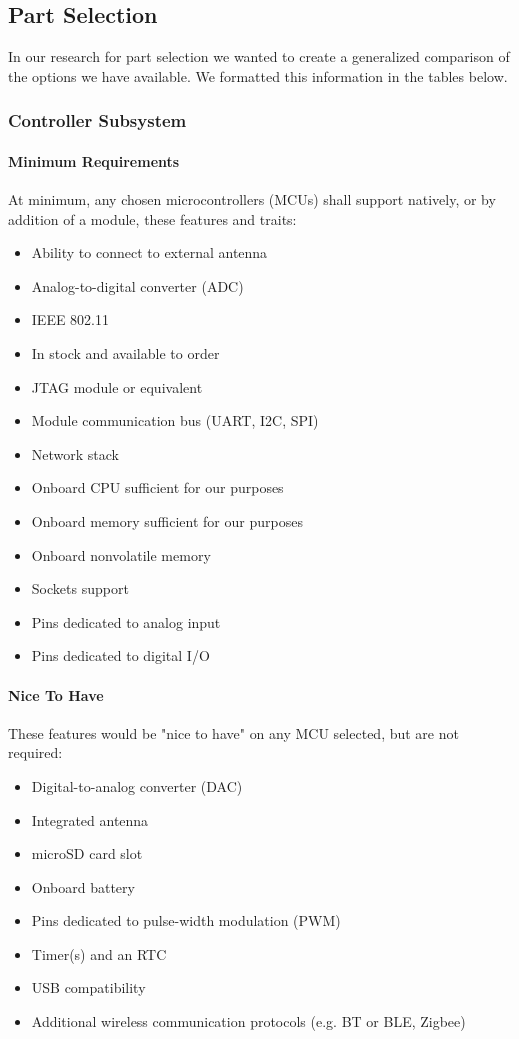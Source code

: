 \subsection{Part Selection}
In our research for part selection we wanted to create a generalized comparison of the options we have available. We formatted this information in the tables below.

\subsubsection{Controller Subsystem}
\paragraph{Minimum Requirements} At minimum, any chosen microcontrollers (MCUs) shall support natively, or by addition of a module, these features and traits:
\begin{itemize}
	\item Ability to connect to external antenna
	\item Analog-to-digital converter (ADC)
	\item IEEE 802.11
	\item In stock and available to order
	\item JTAG module or equivalent
	\item Module communication bus (UART, I2C, SPI)
	\item Network stack
	\item Onboard CPU sufficient for our purposes
	\item Onboard memory sufficient for our purposes
	\item Onboard nonvolatile memory
	\item Sockets support
	\item Pins dedicated to analog input
	\item Pins dedicated to digital I/O
\end{itemize}

\paragraph{Nice To Have} These features would be "nice to have" on any MCU selected, but are not required:
\begin{itemize}
	\item Digital-to-analog converter (DAC)
	\item Integrated antenna
	\item microSD card slot
	\item Onboard battery
	\item Pins dedicated to pulse-width modulation (PWM)
	\item Timer(s) and an RTC
	\item USB compatibility
	\item Additional wireless communication protocols (e.g. BT or BLE, Zigbee)
\end{itemize}

